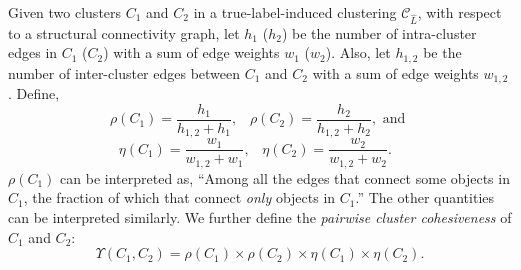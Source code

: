Given two clusters $C_1$ and $C_2$ in a true-label-induced clustering $\mathcal{C}_{\hat{L}}$,
with respect to a structural connectivity graph,
let $h_1$ ($h_2$) be the number of intra-cluster edges in $C_1$ ($C_2$) with a sum of edge weights
$w_1$ ($w_2$). 
Also, let $h_{1,2}$ be the number of inter-cluster edges between $C_1$ and $C_2$ with a 
sum of edge weights $w_{1,2}$.
Define,
%
\begin{equation}
\label{eq:edge_ratio}
\rho(C_1) = \frac{h_1}{h_{1,2}+h_1}, \;\;\; \rho(C_2) = \frac{h_2}{h_{1,2}+h_2}, \mbox{  and }
\end{equation}
\begin{equation}
\label{eq:weights_ratio}
\eta(C_1) = \frac{w_1}{w_{1,2}+w_1}, \;\;\; \eta(C_2) = \frac{w_2}{w_{1,2}+w_2}. \mbox{        }
\end{equation}
$\rho(C_1)$ can be interpreted as, ``Among all the edges that connect some objects in $C_1$, the fraction of which that connect {\it only}
objects in $C_1$.'' The other quantities can be interpreted similarly. 
We further define the \emph{pairwise cluster cohesiveness} of $C_1$ and $C_2$: 
\begin{equation}
\label{eq:inter-cluster_cohesiveness}
\Upsilon(C_1, C_2) = \rho(C_1) \times \rho(C_2) \times \eta(C_1) \times \eta(C_2).
\end{equation}

